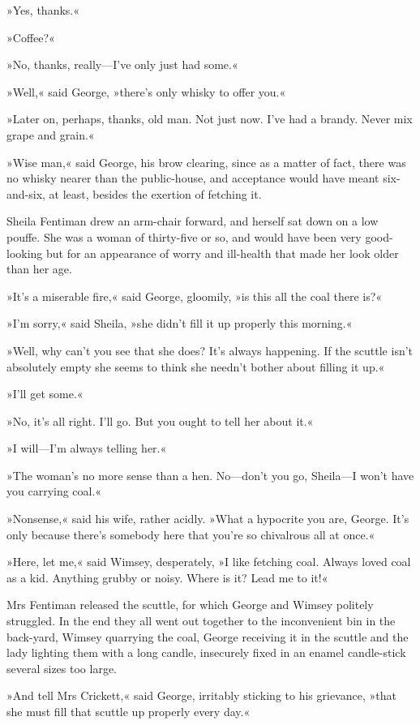 »Yes, thanks.«

»Coffee?«

»No, thanks, really—I've only just had some.«

»Well,« said George, »there's only whisky to offer you.«

»Later on, perhaps, thanks, old man. Not just now. I've had a brandy. Never mix grape and grain.«

»Wise man,« said George, his brow clearing, since as a matter of fact, there was no whisky nearer than the public-house, and acceptance would have meant six-and-six, at least, besides the exertion of fetching it.

Sheila Fentiman drew an arm-chair forward, and herself sat down on a low pouffe. She was a woman of thirty-five or so, and would have been very good-looking but for an appearance of worry and ill-health that made her look older than her age.

»It's a miserable fire,« said George, gloomily, »is this all the coal there is?«

»I'm sorry,« said Sheila, »she didn't fill it up properly this morning.«

»Well, why can't you see that she does? It's always happening. If the scuttle isn't absolutely empty she seems to think she needn't bother about filling it up.«

»I'll get some.«

»No, it's all right. I'll go. But you ought to tell her about it.«

»I will—I'm always telling her.«

»The woman's no more sense than a hen. No—don't you go, Sheila—I won't have you carrying coal.«

»Nonsense,« said his wife, rather acidly. »What a hypocrite you are, George. It's only because there's somebody here that you're so chivalrous all at once.«

»Here, let me,« said Wimsey, desperately, »I like fetching coal. Always loved coal as a kid. Anything grubby or noisy. Where is it? Lead me to it!«

Mrs Fentiman released the scuttle, for which George and Wimsey politely struggled. In the end they all went out together to the inconvenient bin in the back-yard, Wimsey quarrying the coal, George receiving it in the scuttle and the lady lighting them with a long candle, insecurely fixed in an enamel candle-stick several sizes too large.

»And tell Mrs Crickett,« said George, irritably sticking to his grievance, »that she must fill that scuttle up properly every day.«


